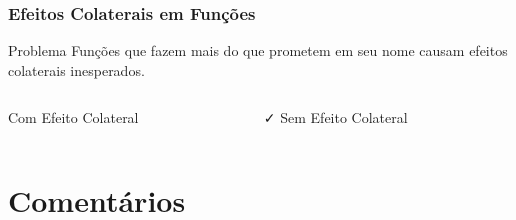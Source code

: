 \documentclass[aspectratio=169]{beamer}
\begin{document}
\begin{frame}
\frametitle{Efeitos Colaterais em Funções}

\begin{alertblock}{Problema}
\footnotesize
Funções que fazem mais do que prometem em seu nome causam efeitos colaterais inesperados.
\end{alertblock}

\vspace{0.3cm}
\begin{columns}
\begin{column}{0.5\textwidth}
\begin{block}{\textcolor{cleanred}{\faTimes} Com Efeito Colateral}
\scriptsize

\end{block}
\end{column}

\begin{column}{0.5\textwidth}
\begin{block}{\textcolor{cleangreen}{\faCheck} Sem Efeito Colateral}
\scriptsize

\end{block}
\end{column}
\end{columns}
\end{frame}

\section{Comentários}
\end{document}
